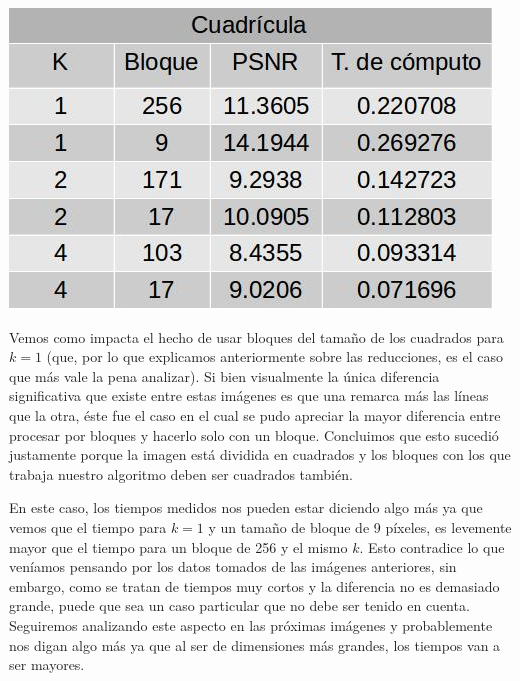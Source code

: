 \documentclass[a4paper]{article}
\begin{document}
\centerline{
\includegraphics[scale=0.5]{imagenes/cuadriculaTabla.jpg}
}

Vemos como impacta el hecho de usar bloques del tamaño de los cuadrados para $k = 1$ (que, por lo que explicamos anteriormente sobre las reducciones, es el caso que más vale la pena analizar). Si bien visualmente la única diferencia significativa que existe entre estas imágenes es que una remarca más las líneas que la otra, éste fue el caso en el cual se pudo apreciar la mayor diferencia entre procesar por bloques y hacerlo solo con un bloque. Concluimos que esto sucedió justamente porque la imagen está dividida en cuadrados y los bloques con los que trabaja nuestro algoritmo deben ser cuadrados también.
\par En este caso, los tiempos medidos nos pueden estar diciendo algo más ya que vemos que el tiempo para $k = 1$ y un tamaño de bloque de 9 píxeles, es levemente mayor que el tiempo para un bloque de 256 y el mismo $k$. Esto contradice lo que veníamos pensando por los datos tomados de las imágenes anteriores, sin embargo, como se tratan de tiempos muy cortos y la diferencia no es demasiado grande, puede que sea un caso particular que no debe ser tenido en cuenta. Seguiremos analizando este aspecto en las próximas imágenes y probablemente nos digan algo más ya que al ser de dimensiones más grandes, los tiempos van a ser mayores.
\end{document}
